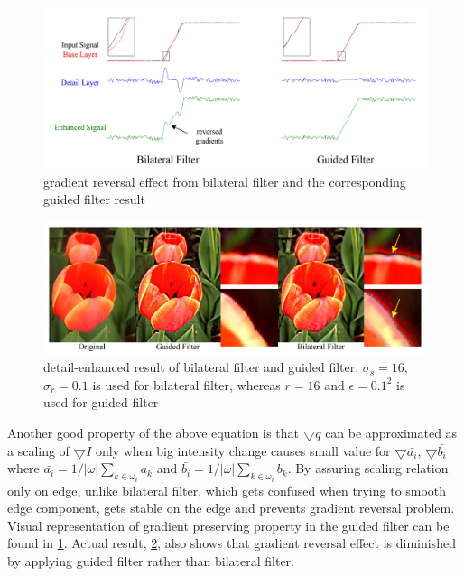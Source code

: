 \documentclass[extendedabs]{bmvc2k}
\begin{document}
\begin{figure}[h]
    \centering
    \includegraphics[width=\linewidth]{hw2_1_1}
    \caption{gradient reversal effect from bilateral filter and the corresponding guided filter result}
    \label{fig:1}
\end{figure}

\begin{figure}[h]
    \centering
    \includegraphics[width=\linewidth]{hw2_1_4}
    \caption{detail-enhanced result of bilateral filter and guided filter.
    $\sigma_s=16$, $\sigma_r=0.1$ is used for bilateral filter, whereas 
    $r=16$ and $\epsilon=0.1^2$ is used for guided filter}
    \label{fig:4}
\end{figure}

Another good property of the above equation is that $\bigtriangledown q$ can be approximated
as a scaling of $\bigtriangledown I$ only when big intensity change causes small value for
$\bigtriangledown \bar{a_i}$, $\bigtriangledown \bar{b_i}$ where
$\bar{a_i} = 1/|\omega|\sum_{k \in \omega_i}a_k$ and 
$\bar{b_i} = 1/|\omega|\sum_{k \in \omega_i}b_k$. By assuring scaling relation only on edge,
unlike bilateral filter, which gets confused when trying to smooth edge component, gets stable on
the edge and prevents gradient reversal problem.  
Visual representation of gradient preserving property in the guided filter can 
be found in \figurename{\ref{fig:1}}.
Actual result, \figurename{\ref{fig:4}}, also shows that gradient reversal effect is diminished by 
applying guided filter rather than bilateral filter.
\end{document}

